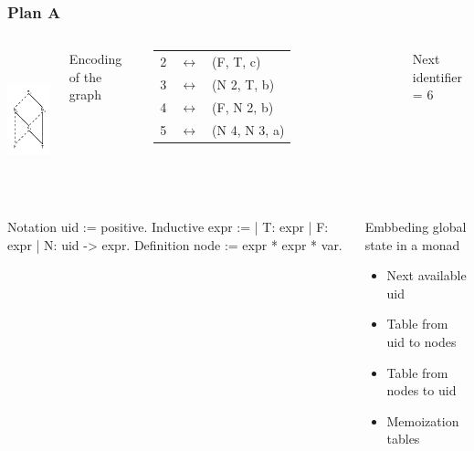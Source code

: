 \documentclass[9pt]{beamer}
\begin{document}
\begin{frame}[fragile]
  \frametitle{Plan A}

\begin{columns}
    \begin{center}
      \includegraphics[height=4cm]{figs/bdd-ex.pdf}
    \end{center}
      {\sc Encoding of the graph}

      \medskip

      \begin{tabular}{ccl}
        2 & $\leftrightarrow$ & (F, T, c) \\
        3 & $\leftrightarrow$ & (N 2, T, b) \\
        4 & $\leftrightarrow$ & (F, N 2, b) \\
        5 & $\leftrightarrow$ & (N 4, N 3, a) \\
      \end{tabular}


      \medskip

      {\sc Next identifier = 6}
  \end{columns}

\pause
  \begin{columns}
    \begin{coq}
      Notation uid := positive.
      Inductive expr :=
      | T: expr
      | F: expr
      | N: uid -> expr.
      Definition node := expr * expr * var.
    \end{coq}
    \begin{block}{Embbeding global state in a monad}
      \begin{itemize}
      \item Next available uid
      \item Table from uid to nodes
      \item Table from nodes to uid
      \item Memoization tables
      \end{itemize}
    \end{block}
  \end{columns}
\end{frame}
\end{document}
